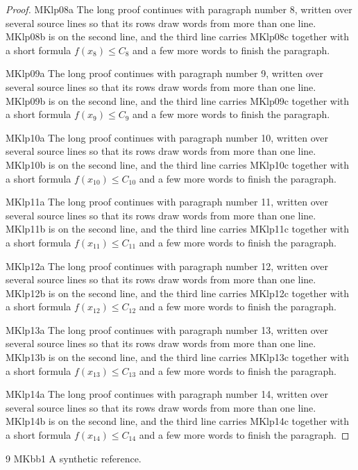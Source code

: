 \documentclass{article}
\begin{document}
\begin{proof}
MKlp08a The long proof continues with paragraph number 8, written over several
source lines so that its rows draw words from more than one line. MKlp08b is on
the second line, and the third line carries MKlp08c together with a short formula
$f(x_8) \le C_8$ and a few more words to finish the paragraph.

MKlp09a The long proof continues with paragraph number 9, written over several
source lines so that its rows draw words from more than one line. MKlp09b is on
the second line, and the third line carries MKlp09c together with a short formula
$f(x_9) \le C_9$ and a few more words to finish the paragraph.

MKlp10a The long proof continues with paragraph number 10, written over several
source lines so that its rows draw words from more than one line. MKlp10b is on
the second line, and the third line carries MKlp10c together with a short formula
$f(x_10) \le C_10$ and a few more words to finish the paragraph.

MKlp11a The long proof continues with paragraph number 11, written over several
source lines so that its rows draw words from more than one line. MKlp11b is on
the second line, and the third line carries MKlp11c together with a short formula
$f(x_11) \le C_11$ and a few more words to finish the paragraph.

MKlp12a The long proof continues with paragraph number 12, written over several
source lines so that its rows draw words from more than one line. MKlp12b is on
the second line, and the third line carries MKlp12c together with a short formula
$f(x_12) \le C_12$ and a few more words to finish the paragraph.

MKlp13a The long proof continues with paragraph number 13, written over several
source lines so that its rows draw words from more than one line. MKlp13b is on
the second line, and the third line carries MKlp13c together with a short formula
$f(x_13) \le C_13$ and a few more words to finish the paragraph.

MKlp14a The long proof continues with paragraph number 14, written over several
source lines so that its rows draw words from more than one line. MKlp14b is on
the second line, and the third line carries MKlp14c together with a short formula
$f(x_14) \le C_14$ and a few more words to finish the paragraph.

\end{proof}



\begin{thebibliography}{9}
 MKbb1 A synthetic reference.
\end{thebibliography}
\end{document}
